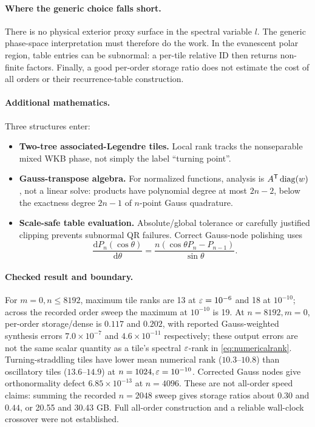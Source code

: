 \paragraph{Where the generic choice falls short.} There is no physical exterior proxy surface in the spectral variable $l$. The generic phase-space interpretation must therefore do the work. In the evanescent polar region, table entries can be subnormal: a per-tile relative ID then returns non-finite factors. Finally, a good per-order storage ratio does not estimate the cost of all orders or their recurrence-table construction.

\paragraph{Additional mathematics.} Three structures enter:
\begin{itemize}
 \item \textbf{Two-tree associated-Legendre tiles.} Local rank tracks the nonseparable mixed WKB phase, not simply the label ``turning point''.
 \item \textbf{Gauss-transpose algebra.} For normalized functions, analysis is $A^{\mathsf{T}}\operatorname{diag}(w)$, not a linear solve: products have polynomial degree at most $2n-2$, below the exactness degree $2n-1$ of $n$-point Gauss quadrature.
 \item \textbf{Scale-safe table evaluation.} Absolute/global tolerance or carefully justified clipping prevents subnormal QR failures. Correct Gauss-node polishing uses
 \[
 \frac{\mathrm dP_n(\cos\theta)}{\mathrm d\theta}
 =\frac{n(\cos\theta P_n-P_{n-1})}{\sin\theta}.
 \]
\end{itemize}

\paragraph{Checked result and boundary.} For $m=0,n\le8192$, maximum tile ranks are 13 at $\varepsilon=10^{-6}$ and 18 at $10^{-10}$; across the recorded order sweep the maximum at $10^{-10}$ is 19. At $n=8192,m=0$, per-order storage/dense is $0.117$ and $0.202$, with reported Gauss-weighted synthesis errors $7.0\times10^{-7}$ and $4.6\times10^{-11}$ respectively; these output errors are not the same scalar quantity as a tile's spectral $\varepsilon$-rank in \eqref{eq:numericalrank}. Turning-straddling tiles have lower mean numerical rank ($10.3$--$10.8$) than oscillatory tiles ($13.6$--$14.9$) at $n=1024,\varepsilon=10^{-10}$. Corrected Gauss nodes give orthonormality defect $6.85\times10^{-13}$ at $n=4096$. These are not all-order speed claims: summing the recorded $n=2048$ sweep gives storage ratios about $0.30$ and $0.44$, or 20.55 and 30.43 GB. Full all-order construction and a reliable wall-clock crossover were not established.

